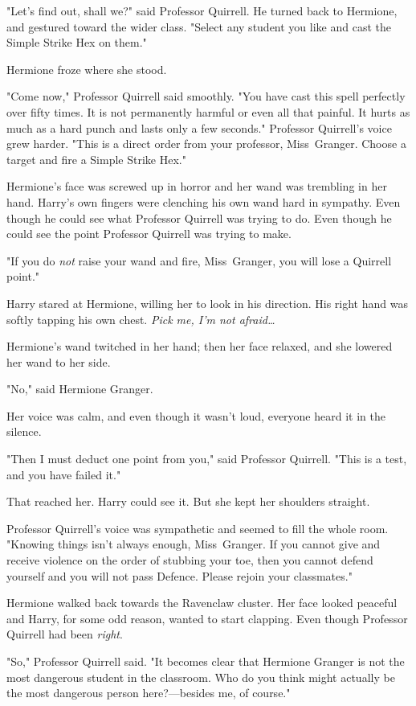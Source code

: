 "Let’s find out, shall we?" said Professor Quirrell. He turned back to
Hermione, and gestured toward the wider class. "Select any student you like and
cast the Simple Strike Hex on them."

Hermione froze where she stood.

"Come now," Professor Quirrell said smoothly. "You have cast this spell
perfectly over fifty times. It is not permanently harmful or even all that
painful. It hurts as much as a hard punch and lasts only a few seconds."
Professor Quirrell’s voice grew harder. "This is a direct order from your
professor, Miss~Granger. Choose a target and fire a Simple Strike Hex."

Hermione’s face was screwed up in horror and her wand was trembling in her
hand. Harry’s own fingers were clenching his own wand hard in sympathy. Even
though he could see what Professor Quirrell was trying to do. Even though he
could see the point Professor Quirrell was trying to make.

"If you do \emph{not} raise your wand and fire, Miss~Granger, you will lose a
Quirrell point."

Harry stared at Hermione, willing her to look in his direction. His right hand
was softly tapping his own chest. \emph{Pick me, I’m not afraid…}

Hermione’s wand twitched in her hand; then her face relaxed, and she lowered
her wand to her side.

"No," said Hermione Granger.

Her voice was calm, and even though it wasn’t loud, everyone heard it in the
silence.

"Then I must deduct one point from you," said Professor Quirrell. "This is a
test, and you have failed it."

That reached her. Harry could see it. But she kept her shoulders straight.

Professor Quirrell’s voice was sympathetic and seemed to fill the whole room.
"Knowing things isn’t always enough, Miss~Granger. If you cannot give and
receive violence on the order of stubbing your toe, then you cannot defend
yourself and you will not pass Defence. Please rejoin your classmates."

Hermione walked back towards the Ravenclaw cluster. Her face looked peaceful
and Harry, for some odd reason, wanted to start clapping. Even though Professor
Quirrell had been \emph{right}.

"So," Professor Quirrell said. "It becomes clear that Hermione Granger is not
the most dangerous student in the classroom. Who do you think might actually be
the most dangerous person here?—besides me, of course."

